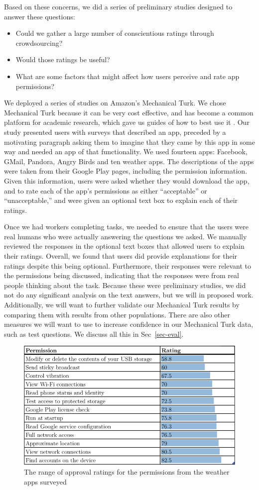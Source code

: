\documentclass[11pt]{article}
\begin{document}
Based on these concerns, we did a series of preliminary studies designed to answer
these questions:
\begin{itemize}
\item Could we gather a large number of conscientious ratings through crowdsourcing?
\item Would those ratings be useful?
\item What are some factors that might affect how users perceive and rate 
app permissions?
\end{itemize}
We deployed a series of studies on Amazon's Mechanical Turk. We chose
Mechanical Turk because it can be very cost effective, and has become
a common platform for academic research, which gave us guides of how
to best use it \cite{reseach-mturk-BRM12, mturk-data-quality-PPS11}. 
Our study presented users with surveys that
described an app, preceded by a motivating paragraph asking
them to imagine that they came by this app in some way and needed an
app of that functionality.  We used fourteen apps: Facebook, GMail,
Pandora, Angry Birds and ten weather apps.  The descriptions
of the apps were taken from their Google Play pages, including the
permission information. Given this information, users were asked
whether they would download the app, and to rate each of the app's
permissions as either ``acceptable'' or ``unacceptable,'' and were
given an optional text box to explain each of their ratings.

Once we had workers completing tasks, we needed to ensure that the
users were real humans who were actually answering the questions we
asked. We manually reviewed the responses in the optional text boxes
that allowed users to explain their ratings. Overall, we found that
users did provide explanations for their ratings despite this being
optional. Furthermore, their responses were relevant to the
permissions being discussed, indicating that the responses were from
real people thinking about the task. Because these were preliminary
studies, we did not do any significant analysis on the text answers,
but we will in proposed work. Additionally, we will want to further
validate our Mechanical Turk results by comparing them with results
from other populations. There are also other measures we will want to
use to increase confidence in our Mechanical Turk data, such as test
questions.  We discuss all this in Sec~\ref{sec-eval}.

\begin{figure}[t]
\centering
    \includegraphics[width=.6\linewidth]{img/RatingTable.png}
    \vspace{1pt}
    \caption{The range of approval ratings for the permissions from the 
    weather apps surveyed}
    \label{weatherratings}
\end{figure}
\end{document}
